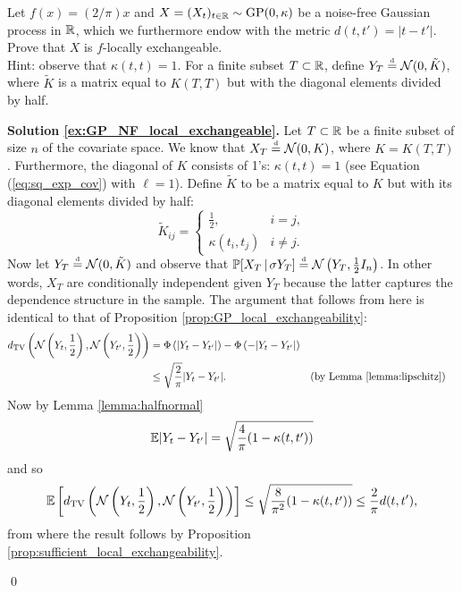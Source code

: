 \vskip 0.75cm


\begin{exercise} \label{ex:GP_NF_local_exchangeable}
	Let $f(x) = (2/\pi) x$ and $X = (X_t)_{t \in \mathbb{R}} \sim \mathrm{GP} (0, \kappa)$ be a noise-free Gaussian process in $\mathbb{R}$, which we furthermore endow with the metric  $d(t, t') = |t-t'|$. Prove that $X$ is $f$-locally exchangeable. \\
	
	Hint: observe that $\kappa(t, t) = 1$.	For a finite subset $T \subset \mathbb{R}$, define $Y_T \stackrel{\text{\rm\tiny d}}{=} \mathcal{N} ( 0, \tilde{K} )$, where $\tilde{K}$ is a matrix equal to $K(T, T)$ but with the diagonal elements divided by half.
\end{exercise}


\textbf{Solution \ref{ex:GP_NF_local_exchangeable}. \hspace{0.05cm}} Let $T \subset \mathbb{R}$ be a finite subset of size $n$ of the covariate space. We know that $X_T \stackrel{\text{\rm\tiny d}}{=} \mathcal{N} (0, K)$, where $K = K(T,T)$. Furthermore, the diagonal of $K$ consists of 1's: $\kappa(t, t) = 1$ (see Equation (\ref{eq:sq_exp_cov}) with $\ell = 1$). Define $\tilde{K}$ to be a matrix equal to $K$ but with its diagonal elements divided by half:
\begin{equation*}
	\tilde{K}_{ij} = \begin{cases}
					  	\frac{1}{2}, & i=j, \\
					  	\kappa(t_i, t_j) & i \neq j.
					  \end{cases}
\end{equation*}
Now let $Y_T \stackrel{\text{\rm\tiny d}}{=} \mathcal{N}(0, \tilde{K})$ and observe that $\mathbb{P} [ X_T \, | \, \sigma Y_T ] \stackrel{\text{\rm\tiny d}}{=} \mathcal{N} \left( Y_T, \frac{1}{2} I_n \right)$. In other words, $X_T$ are conditionally independent given $Y_T$ because the latter captures the dependence structure in the sample. The argument that follows from here is identical to that of Proposition \ref{prop:GP_local_exchangeability}:
\begin{align*}
	d_{\mathrm{TV}} \left( \mathcal{N} \left( Y_t, \frac{1}{2} \right) , \mathcal{N} \left( Y_{t'}, \frac{1}{2} \right) \right) &= \Phi \left( |Y_t - Y_{t'} | \right) - \Phi \left( -|Y_t - Y_{t'} | \right) \\
		&\leq \sqrt{\frac{2}{\pi}} |Y_t - Y_{t'}|. && \text{(by Lemma \ref{lemma:lipschitz})}
\end{align*}
Now by Lemma \ref{lemma:halfnormal}
\begin{equation*}
	\mathbb{E} | Y_t - Y_{t'} | = \sqrt{\frac{4}{\pi}(1 - \kappa(t, t'))}
\end{equation*}
and so
\begin{equation*}
	\mathbb{E} \left[ d_{\mathrm{TV}} \left( \mathcal{N} \left( Y_t, \frac{1}{2} \right) , \mathcal{N} \left( Y_{t'}, \frac{1}{2} \right) \right) \right] \leq \sqrt{\frac{8}{\pi^2}(1 - \kappa(t, t'))} \leq \frac{2}{\pi} d(t, t'),
\end{equation*}
from where the result follows by Proposition \ref{prop:sufficient_local_exchangeability}.

\qed 

